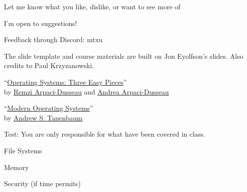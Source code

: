 \begin{slide}


    Let me know what you like, dislike, or want to see more of
    \bigskip
    
    I'm open to suggestions!
	\bigskip
	
	Feedback through Discord: mtxu

\end{slide}

\begin{slide}

	
	The slide template and course materials are built on Jon Eyolfson's slides.
	Also credits to Paul Krzyzanowski.
	
\end{slide}

\begin{slide}


    ``\href{https://pages.cs.wisc.edu/~remzi/OSTEP/}
	   {Operating Systems: Three Easy Pieces}'' \\
    by \href{http://www.cs.wisc.edu/~remzi/}{Remzi Arpaci-Dusseau}
    and \href{http://www.cs.wisc.edu/~dusseau/}{Andrea Arpaci-Dusseau}
    \bigskip

    ``\href{https://en.wikipedia.org/wiki/Modern_Operating_Systems}
           {Modern Operating Systems}'' \\
    by \href{https://en.wikipedia.org/wiki/Andrew_S._Tanenbaum}{Andrew S. Tanenbaum}
    \bigskip
							      
    Test: You are only responsible for what have been covered in class.

\end{slide}

\begin{slide}

	
	File Systems
	\bigskip
	
	Memory
	\bigskip
	
	Security (if time permits)

\end{slide}

